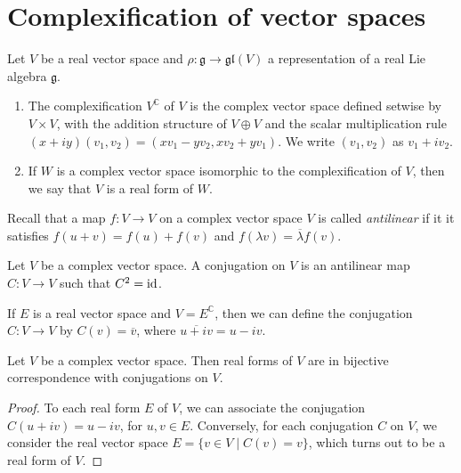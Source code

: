 \documentclass{report}
\begin{document}
\section{Complexification of vector spaces}
\begin{definition}
    Let $V$ be a real vector space and $\rho: \mathfrak g \to \mathfrak{gl}(V)$ a representation of a real Lie algebra $\mathfrak g$.
    \begin{enumerate}[label=(\roman*)]
        \item The complexification $V^\mathbb C$ of $V$ is the complex vector space defined setwise by $V \times V$, with the addition structure of $V \oplus V$ and the scalar multiplication rule $(x + i y) (v_1, v_2) = (x v_1 - y v_2, x v_2 + y v_1)$.
        We write $(v_1, v_2)$ as $v_1 + i v_2$.
        \item If $W$ is a complex vector space isomorphic to the complexification of $V$, then we say that $V$ is a real form of $W$.
    \end{enumerate}
\end{definition}

Recall that a map $f: V \to V$ on a complex vector space $V$ is called \emph{antilinear} if it it satisfies $f(u + v) = f(u) + f(v)$ and $f(\lambda v) = \overline \lambda f(v)$.
\begin{definition}
    Let $V$ be a complex vector space.
    A conjugation on $V$ is an antilinear map $C: V \to V$ such that $C^2 = \operatorname{id}$.
\end{definition}
\begin{example}
    If $E$ is a real vector space and $V= E^\mathbb C$, then we can define the conjugation $C: V \to V$ by $C(v) = \overline v$, where $\overline{u + iv} = u - iv$.
\end{example}
\begin{proposition}
    Let $V$ be a complex vector space.
    Then real forms of $V$ are in bijective correspondence with conjugations on $V$.
\end{proposition}
\begin{proof}
    To each real form $E$ of $V$, we can associate the conjugation $C(u + iv) = u - iv$, for $u, v \in E$.
    Conversely, for each conjugation $C$ on $V$, we consider the real vector space $E = \{ v \in V \mid C(v) = v \}$, which turns out to be a real form of $V$.
\end{proof}
\end{document}
